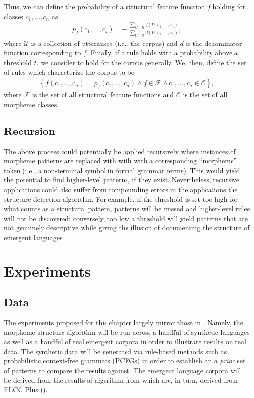 Thus, we can define the probability of a structural feature function $f$ holding for classes $c_1, \dots, c_n$ as
\begin{align}
  p_f(c_1, \dots, c_n) &\equiv \frac{\sum_{U\in\mathcal U} f(U, c_1, \dots, c_n)}{\sum_{U\in\mathcal U} d(U, c_1, \dots, c_n)}
  ,
\end{align}
where
  $\mathcal U$ is a collection of utterances (i.e., the corpus)
  and $d$ is the denominator function corresponding to $f$.
Finally, if a rule holds with a probability above a threshold $t$, we consider to hold for the corpus generally.
We, then, define the set of rules which characterize the corpus to be
\begin{align}
  \left\{
    f(c_1, \dots, c_n) \; \middle| \;
    p_f(c_1, \dots, c_n) \wedge f \in \mathcal F \wedge c_1, \dots, c_n \in \mathcal C
  \right\}
  ,
\end{align}
where $\mathcal F$ is the set of all structural feature functions and $\mathcal C$ is the set of all morpheme classes.

\subsection{Recursion}
The above process could potentially be applied recursively where instances of morpheme patterns are replaced with with with a corresponding ``morpheme'' token (i.e., a non-terminal symbol in formal grammar terms).
This would yield the potential to find higher-level patterns, if they exist.
Nevertheless, recursive applications could also suffer from compounding errors in the applications the structure detection algorithm.
For example, if the threshold is set too high for what counts as a structural pattern, patterns will be missed and higher-level rules will not be discovered; conversely, too low a threshold will yield patterns that are not genuinely descriptive while giving the illusion of documenting the structure of emergent languages.


\section{Experiments}
\unskip\label{syntax:sec:experiments}

\subsection{Data}
The experiments proposed for this chapter largely mirror those in .
Namely, the morpheme structure algorithm will be run across a handful of synthetic languages as well as a handful of real emergent corpora in order to illustrate results on real data.
The synthetic data will be generated via rule-based methods such as probabilistic context-free grammars (PCFGs) in order to establish an \emph{a prior} set of patterns to compare the results against.
The emergent language corpora will be derived from the results of algorithm from  which are, in turn, derived from ELCC Plus ().

